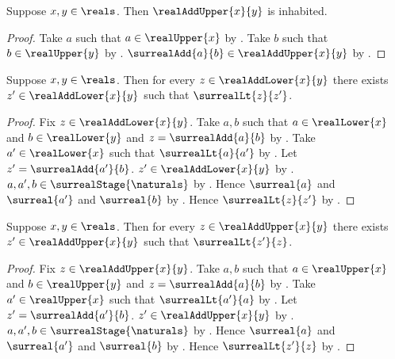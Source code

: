 \begin{proposition}\label{surreal_real_add_upper_inhabited}
    Suppose $x,y\in\reals$.
    Then $\realAddUpper{x}{y}$ is inhabited.
\end{proposition}
\begin{proof}
    Take $a$ such that $a\in\realUpper{x}$
        by .
    Take $b$ such that $b\in\realUpper{y}$
        by .
    $\surrealAdd{a}{b}\in\realAddUpper{x}{y}$
        by .
\end{proof}

\begin{proposition}\label{surreal_real_add_lower_no_maximum}
    Suppose $x,y\in\reals$.
    Then for every $z\in\realAddLower{x}{y}$ there exists
        $z'\in\realAddLower{x}{y}$ such that $\surrealLt{z}{z'}$.
\end{proposition}
\begin{proof}
    Fix $z\in\realAddLower{x}{y}$.
    Take $a,b$ such that
        $a\in\realLower{x}$ and $b\in\realLower{y}$ and
        $z=\surrealAdd{a}{b}$
        by .
    Take $a'\in\realLower{x}$ such that $\surrealLt{a}{a'}$
        by .
    Let $z'=\surrealAdd{a'}{b}$.
    $z'\in\realAddLower{x}{y}$
        by .
    $a,a',b\in\surrealStage{\naturals}$
        by .
    Hence $\surreal{a}$ and $\surreal{a'}$ and $\surreal{b}$
        by
        .
    Hence $\surrealLt{z}{z'}$
        by .
\end{proof}

\begin{proposition}\label{surreal_real_add_upper_no_minimum}
    Suppose $x,y\in\reals$.
    Then for every $z\in\realAddUpper{x}{y}$ there exists
        $z'\in\realAddUpper{x}{y}$ such that $\surrealLt{z'}{z}$.
\end{proposition}
\begin{proof}
    Fix $z\in\realAddUpper{x}{y}$.
    Take $a,b$ such that
        $a\in\realUpper{x}$ and $b\in\realUpper{y}$ and
        $z=\surrealAdd{a}{b}$
        by .
    Take $a'\in\realUpper{x}$ such that $\surrealLt{a'}{a}$
        by .
    Let $z'=\surrealAdd{a'}{b}$.
    $z'\in\realAddUpper{x}{y}$
        by .
    $a,a',b\in\surrealStage{\naturals}$
        by .
    Hence $\surreal{a}$ and $\surreal{a'}$ and $\surreal{b}$
        by
        .
    Hence $\surrealLt{z'}{z}$
        by .
\end{proof}

